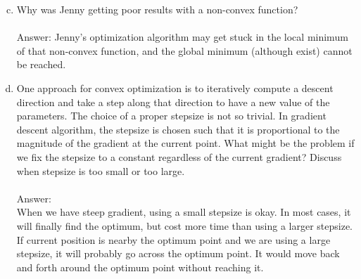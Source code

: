 \documentclass[11pt]{article}
\begin{document}
\begin{enumerate}[(a)]
\setcounter{enumi}{2}
\item Why was Jenny getting poor results with a non-convex function?\\\\
Answer: Jenny's optimization algorithm may get stuck in the local minimum of that non-convex function, and the global minimum (although exist) cannot be reached.

\item One approach for convex optimization is to iteratively compute a descent direction and take a step along that direction to have a new value of the parameters. The choice of a proper stepsize is not so trivial. In gradient descent algorithm, the stepsize is chosen such that it is proportional to the magnitude of the gradient at the current point. What might be the problem if we fix the stepsize to a constant regardless of the current gradient? Discuss when stepsize is too small or too large.\\\\
Answer:\\
When we have steep gradient, using a small stepsize is okay. In most cases, it will finally find the optimum, but cost more time than using a larger stepsize.\\  
If current position is nearby the optimum point and we are using a large stepsize, it will probably go across the optimum point. It would move back and forth around the optimum point without reaching it.
\end{enumerate}
\end{document}
